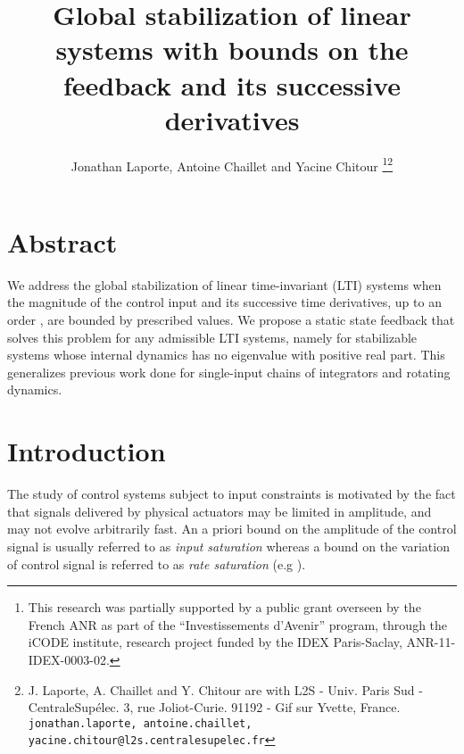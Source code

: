 \documentclass[letterpaper, 10pt]{article}
\title{\Large\bf
Global stabilization of linear systems with bounds on the feedback and its successive derivatives
}
\author{Jonathan Laporte, Antoine Chaillet and Yacine Chitour \thanks{This research was partially supported by a public grant overseen by the French ANR as part of the “Investissements d'Avenir” program, through the iCODE institute, research project funded by the IDEX Paris-Saclay, ANR-11-IDEX-0003-02.}\thanks{J. Laporte, A. Chaillet  and  Y. Chitour  are with L2S - Univ. Paris Sud - CentraleSup\'elec. 3, rue Joliot-Curie. 91192 - Gif sur Yvette, France.
        {\tt\small jonathan.laporte, antoine.chaillet, yacine.chitour@l2s.centralesupelec.fr}}}
\begin{document}
\newcommand{\AC}[1]{\textcolor{blue}{#1}}
\newcommand{\JL}[1]{\textbf{\textcolor{orange}{#1}}}
\newcommand{\ACC}[1]{\textcolor{BlueViolet}{#1}}

\date{}
\maketitle


\section*{Abstract}
We address the global stabilization of linear time-invariant (LTI) systems when the magnitude of the control input and its successive time derivatives, up to an order , are bounded by prescribed values. We propose a static state feedback that solves this problem for any admissible LTI systems, namely for stabilizable systems whose internal dynamics has no eigenvalue with positive real part. This generalizes previous work done for single-input chains of integrators and rotating dynamics. 

\section{Introduction}
The study of control systems subject to input constraints is motivated by the fact that signals delivered by physical actuators may be limited in amplitude, and may not evolve arbitrarily fast. An a priori bound on the amplitude of the control signal is usually referred to as \emph{input saturation} whereas a bound on the variation of control signal is referred to as \emph{rate saturation} (e.g \cite{saberi2012}).
\end{document}
